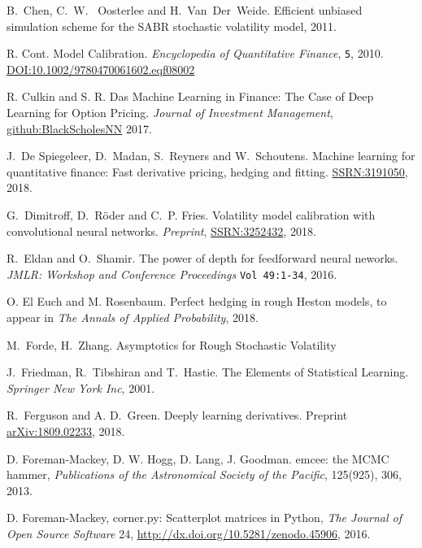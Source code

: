 \documentclass{article}
\theoremstyle{remark}
\begin{document}
\begin{thebibliography}{99}
 B.~Chen, C.~W. ~Oosterlee and H.~Van~Der~Weide. Efficient unbiased simulation scheme for the SABR stochastic volatility model, 2011.

R. Cont.
Model Calibration.
\textit{Encyclopedia of Quantitative Finance},
{\tt 5}, 2010. \href{https://doi.org/10.1002/9780470061602.eqf08002
}{DOI:10.1002/9780470061602.eqf08002}

R. Culkin and S. R. Das 
Machine Learning in Finance: The Case of Deep Learning for Option Pricing. 
\textit{Journal of Investment Management}, \href{https:srdas.github.io/Papers/BlackScholesNN.pdf}{github:BlackScholesNN} 2017.

 J.~De Spiegeleer, D.~Madan, S.~Reyners and W.~Schoutens. Machine learning for quantitative finance:
Fast derivative pricing, hedging and fitting. \href{https://papers.ssrn.com/sol3/papers.cfm?abstract_id=3191050}{SSRN:3191050}, 2018.

 G.~Dimitroff, D.~R\"oder and C.~P. Fries. Volatility model calibration with convolutional neural networks. \textit{Preprint}, \href{https://papers.ssrn.com/sol3/papers.cfm?abstract_id=3252432}{SSRN:3252432}, 2018.

R.~Eldan and O.~Shamir. The power of depth for feedforward neural neworks. \textit{JMLR: Workshop and Conference Proceedings} {\tt Vol 49:1-34}, 2016.

O. El Euch and M. Rosenbaum.
Perfect hedging in rough Heston models, to appear in
\textit{The Annals of Applied Probability}, 2018.

 M.~Forde, H.~Zhang. Asymptotics for Rough Stochastic Volatility

J.~Friedman, R.~Tibshiran and  T.~Hastie. The Elements of Statistical Learning. \textit{Springer New York Inc}, 2001.

 R.~Ferguson and A. D.~Green. Deeply learning derivatives.
  Preprint \href{https://arxiv.org/abs/1809.02233}{arXiv:1809.02233}, 2018.

 D. Foreman-Mackey, D. W. Hogg, D. Lang, J. Goodman.
  emcee: the MCMC hammer, \emph{Publications of the Astronomical Society of
    the Pacific}, 125(925), 306, 2013.

 D. Foreman-Mackey, corner.py: Scatterplot matrices in Python,
  \emph{The Journal of Open Source Software} 24,
  \url{http://dx.doi.org/10.5281/zenodo.45906}, 2016.


\end{thebibliography}
\end{document}
